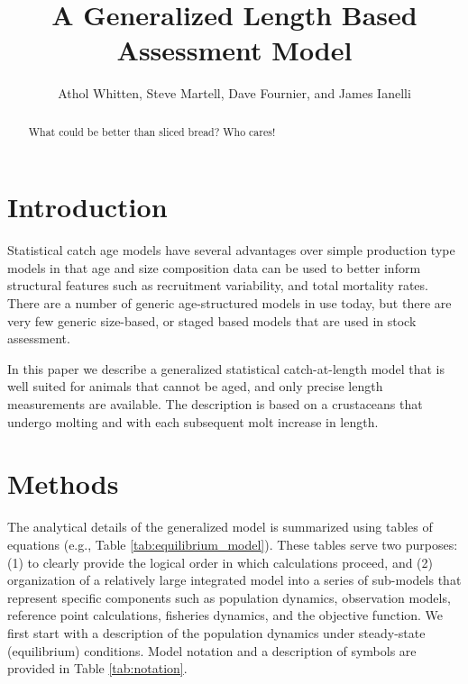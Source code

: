 \documentclass[12pt,letterpaper]{article}
\title{A Generalized Length Based Assessment Model}
\author{Athol Whitten, Steve Martell, Dave Fournier, and James Ianelli}
\begin{document}
  \maketitle

  \begin{abstract}
   What could be better than sliced bread?  Who cares!

  \end{abstract}


  \section*{Introduction} %
  \label{sec:introduction}
  
  Statistical catch age models have several advantages over simple production type models in that age and size composition data can be used to better inform structural features such as recruitment variability, and total mortality rates.  There are a number of generic age-structured models in use today, but there are very few generic size-based, or staged based models that are used in stock assessment.

  In this paper we describe a generalized statistical catch-at-length model that is well suited for animals that cannot be aged, and only precise length measurements are available. The description is based on a crustaceans that undergo molting and with each subsequent molt increase in length.


  \section*{Methods} %
  \label{sec:methods}
  The analytical details of the generalized model is summarized using tables of equations (e.g., Table \ref{tab:equilibrium_model}).   These tables serve two purposes: (1) to clearly provide the logical order in which calculations proceed, and (2) organization of a relatively large integrated model into a series of sub-models that represent specific components such as population dynamics, observation models, reference point calculations, fisheries dynamics, and the objective function.  We first start with a description of the population dynamics under steady-state (equilibrium) conditions.  Model notation and a description of symbols are provided in Table \ref{tab:notation}.
\end{document}

